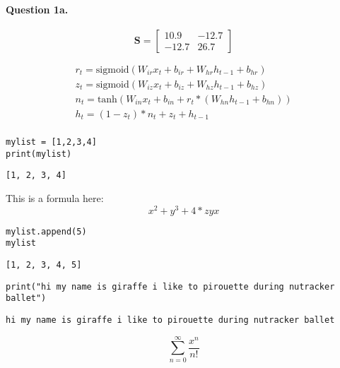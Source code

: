 \documentclass[
]{article}
\author{}
\date{}
\begin{document}
\hypertarget{question-1a.}{%
\paragraph{Question 1a.}\label{question-1a.}}

\[
\mathbf{S} = \left[\begin{array}
{rr}
10.9 & -12.7 \\
-12.7 & 26.7
\end{array}\right]
\]

\[
\begin{array}{ll}
r_t = \text{sigmoid}(W_{ir} x_t + b_{ir} + W_{hr} h_{t-1} + b_{hr}) \\
z_t = \text{sigmoid}(W_{iz} x_t + b_{iz} + W_{hz} h_{t-1} + b_{hz}) \\
n_t = \text{tanh}(W_{in} x_t + b_{in} + r_t * (W_{hn} h_{t-1} + b_{hn})) \\
h_t = (1 - z_t) * n_t + z_t + h_{t-1} \\
\end{array}
\]

\begin{verbatim}
mylist = [1,2,3,4]
print(mylist)
\end{verbatim}

\begin{verbatim}
[1, 2, 3, 4]
\end{verbatim}

This is a formula here: \[
x^2 + y^3 + 4*zyx
\]

\begin{verbatim}
mylist.append(5)
mylist
\end{verbatim}

\begin{verbatim}
[1, 2, 3, 4, 5]
\end{verbatim}

\begin{verbatim}
print("hi my name is giraffe i like to pirouette during nutracker ballet")
\end{verbatim}

\begin{verbatim}
hi my name is giraffe i like to pirouette during nutracker ballet
\end{verbatim}

\[
\sum_{n = 0}^{\infty} \frac {x^n} {n!}
\]
\end{document}
